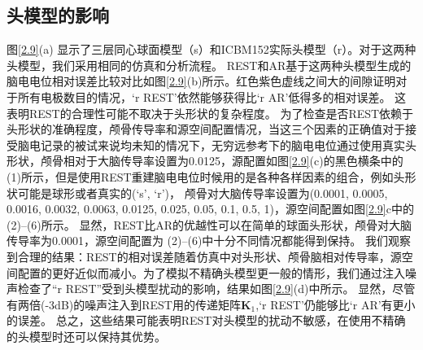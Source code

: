 \subsection{头模型的影响}
\label{ch3.7}
图\ref{2.9}(a) 显示了三层同心球面模型（s）和ICBM152实际头模型（r）。对于这两种头模型，我们采用相同的仿真和分析流程。 REST和AR基于这两种头模型生成的脑电电位相对误差比较对比如图\ref{2.9}(b)所示。红色紫色虚线之间大的间隙证明对于所有电极数目的情况，‘r REST’依然能够获得比‘r AR’低得多的相对误差。
这表明REST的合理性可能不取决于头形状的复杂程度。 为了检查是否REST依赖于头形状的准确程度，颅骨传导率和源空间配置情况，当这三个因素的正确值对于接受脑电记录的被试来说均未知的情况下，无穷远参考下的脑电电位通过使用真实头形状，颅骨相对于大脑传导率设置为0.0125，源配置如图\ref{2.9}(c)的黑色横条中的(1)所示，但是使用REST重建脑电电位时候用的是各种各样因素的组合，例如头形状可能是球形或者真实的(‘s’, ‘r’)， 颅骨对大脑传导率设置为(0.0001, 0.0005, 0.0016, 0.0032, 0.0063, 0.0125, 0.025, 0.05, 0.1, 0.5, 1)，源空间配置如图\ref{2.9}c中的(2)–(6)所示。 显然，REST比AR的优越性可以在简单的球面头形状，颅骨对大脑传导率为0.0001，源空间配置为 (2)–(6)中十分不同情况都能得到保持。 我们观察到合理的结果：REST的相对误差随着仿真中对头形状、颅骨脑相对传导率，源空间配置的更好近似而减小。为了模拟不精确头模型更一般的情形，我们通过注入噪声检查了“r REST”受到头模型扰动的影响，结果如图\ref{2.9}(d)中所示。 显然，尽管有两倍(-3dB)的噪声注入到REST用的传递矩阵$\mathbf{K}_1$,‘r
REST’仍能够比‘r AR’有更小的误差。 总之，这些结果可能表明REST对头模型的扰动不敏感，在使用不精确的头模型时还可以保持其优势。
